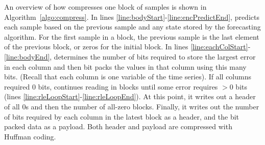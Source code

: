 

\newcommand{\err}{\texttt{err}}
\newcommand{\nbits}{\texttt{nbits}}
\newcommand{\packed}{\texttt{packed}}
\newcommand{\buff}{$\texttt{buff}$}
\newcommand{\bytes}{\texttt{bytes}}
\newcommand{\payload}{\texttt{payload}}
\newcommand{\f}{\texttt{f}}
\newcommand{\fore}{\texttt{forecaster}}
\newcommand{\self}{\texttt{self}}


An overview of how \minesp compresses one block of samples is shown in Algorithm~\ref{algo:compress}. In lines \ref{line:bodyStart}-\ref{line:encPredictEnd}, \minesp predicts each sample based on the previous sample and any state stored by the forecasting algorithm. For the first sample in a block, the previous sample is the last element of the previous block, or zeros for the initial block. In lines \ref{line:eachColStart}-\ref{line:bodyEnd}, \minesp determines the number of bits required to store the largest error in each column and then bit packs the values in that column using this many bits. (Recall that each column is one variable of the time series). If all columns required 0 bits, \minesp continues reading in blocks until some error requires $>$0 bits (lines \ref{line:rleLoopStart}-\ref{line:rleLoopEnd}). At this point, it writes out a header of all 0s and then the number of all-zero blocks. Finally, it writes out the number of bits required by each column in the latest block as a header, and the bit packed data as a payload. Both header and payload are compressed with Huffman coding.

